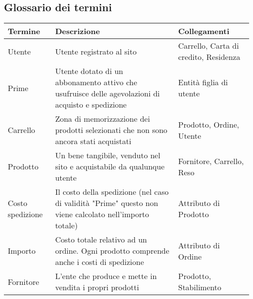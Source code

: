 \documentclass[11pt]{article}
\begin{document}
\subsection{Glossario dei termini}

\begin{center}
    
    \begin{tabularx}{0.98\textwidth} {
        | >{\raggedright\arraybackslash}X |
          >{\raggedright\arraybackslash}X |
          >{\raggedright\arraybackslash}X |
    }
        \hline
        \textbf{Termine} & \textbf{Descrizione} & \textbf{Collegamenti} \\
        \hline\hline

        Utente &
        Utente registrato al sito &
        Carrello, Carta di credito, Residenza \\ 
        \hline

        Prime &
        Utente dotato di un abbonamento attivo che usufruisce delle agevolazioni di acquisto e spedizione &
        Entità figlia di utente \\ 
        \hline

        Carrello &
        Zona di memorizzazione dei prodotti selezionati che non sono ancora stati acquistati  &
        Prodotto, Ordine, Utente\\
        \hline

        Prodotto &
        Un bene tangibile, venduto nel sito e acquistabile da qualunque utente &
        Fornitore, Carrello, Reso\\
        \hline

        Costo spedizione &
        Il costo della spedizione (nel caso di validità "Prime" questo non viene calcolato nell'importo totale) &
        Attributo di Prodotto\\
        \hline

        Importo &
        Costo totale relativo ad un ordine. Ogni prodotto comprende anche i costi di spedizione &
        Attributo di Ordine \\ 
        \hline

        Fornitore &
        L'ente che produce e mette in vendita i propri prodotti &
        Prodotto, Stabilimento \\ 
        \hline  


\end{tabularx}
\end{center}
\end{document}
